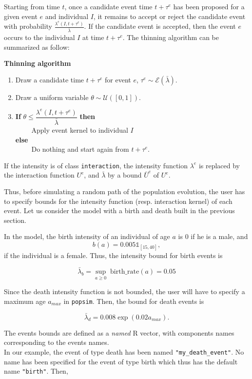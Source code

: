 Starting from time \(t\), once a candidate event time \(t + \tau^e\) has been proposed for a given event \(e\) and individual \(I\), it remains to accept or reject the candidate event with probability \(\frac{\lambda^e(I,t+\tau^e)}{\bar{\lambda}}\). If the candidate event is accepted, then the event \(e\) occurs to the individual \(I\) at time \(t + \tau^e\). The thinning algorithm can be summarized as follow:

\textbf{Thinning algorithm}

\begin{enumerate}
\def\labelenumi{\arabic{enumi}.}
\tightlist
\item
  Draw a candidate time \(t+\tau^e\) for event \(e\), \(\tau^e \sim \mathcal E(\bar \lambda)\).
\item
  Draw a uniform variable \(\theta \sim \mathcal U([0,1])\).
\item
  \textbf{If} \(\theta \leq \dfrac{\lambda^e(I,t+\tau^e)}{\bar\lambda}\) \textbf{then}\\
  \(\qquad\) Apply event kernel to individual \(I\)\\
  \textbf{else}\\
  \(\qquad\) Do nothing and start again from \(t+\tau^e\).
\end{enumerate}

If the intensity is of class \texttt{interaction}, the intensity function \(\lambda^e\) is replaced by the interaction function \(U^e\), and \(\bar \lambda\) by a bound \(\bar U^e\) of \(U^e\).

Thus, before simulating a random path of the population evolution, the user has to specify bounds for the intensity function (resp. interaction kernel) of each event. Let us consider the model with a birth and death built in the previous section.

In the model, the birth intensity of an individual of age \(a\) is \(0\) if he is a male, and
\[ b(a) = 0.005  \mathbb{1}_{[15,40]},\]
if the individual is a female. Thus, the intensity bound for birth events is

\[\bar\lambda_b = \sup_{a\geq 0} \;  \text{birth\_rate}(a) = 0.05\]

Since the death intensity function is not bounded, the user will have to specify a maximum age \(a_{max}\) in \texttt{popsim}. Then, the bound for death events is

\[ \bar \lambda_d = 0.008\exp(0.02 a_{max}).\]

The events bounds are defined as a \emph{named} R vector, with components names corresponding to the events names.\\
In our example, the event of type death has been named \texttt{"my\_death\_event"}. No name has been specified for the event of type birth which thus has the default name \texttt{"birth"}. Then,

